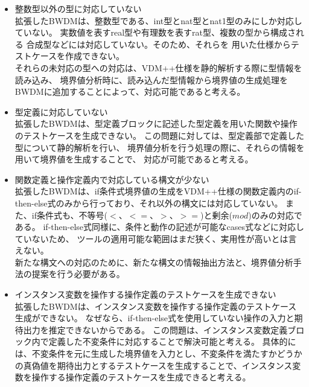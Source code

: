 \documentclass[uplatex, report, a4j, 10pt]{jsbook}
\begin{document}
\begin{itemize}
  \item 整数型以外の型に対応していない\\
        拡張したBWDMは、整数型である、int型とnat型とnat1型のみにしか対応していない。
        実数値を表すreal型や有理数を表すrat型、複数の型から構成される
        合成型などには対応していない。そのため、それらを
        用いた仕様からテストケースを作成できない。\\
        それらの未対応の型への対応は、VDM++仕様を静的解析する際に型情報を読み込み、
        境界値分析時に、読み込んだ型情報から境界値の生成処理をBWDMに追加することによって、対応可能であると考える。

  \item 型定義に対応していない\\
        拡張したBWDMは、型定義ブロックに記述した型定義を用いた関数や操作のテストケースを生成できない。
        この問題に対しては、型定義部で定義した型について静的解析を行い、
        境界値分析を行う処理の際に、それらの情報を用いて境界値を生成することで、
        対応が可能であると考える。

  \item 関数定義と操作定義内で対応している構文が少ない\\
        拡張したBWDMは、if条件式境界値の生成をVDM++仕様の関数定義内のif-then-else式のみから行っており、それ以外の構文には対応していない。
        また、if条件式も、不等号($<、<=、>、>=$)と剰余($mod$)のみの対応である。
        if-then-else式同様に、条件と動作の記述が可能なcases式などに対応していないため、
        ツールの適用可能な範囲はまだ狭く、実用性が高いとは言えない。\\
        新たな構文への対応のために、新たな構文の情報抽出方法と、境界値分析手法の提案を行う必要がある。

  \item インスタンス変数を操作する操作定義のテストケースを生成できない\\
        拡張したBWDMは、インスタンス変数を操作する操作定義のテストケース生成ができない。
        なぜなら、if-then-else式を使用していない操作の入力と期待出力を推定できないからである。
        この問題は、インスタンス変数定義ブロック内で定義した不変条件に対応することで解決可能と考える。
        具体的には、不変条件を元に生成した境界値を入力とし、不変条件を満たすかどうかの真偽値を期待出力とするテストケースを生成することで、インスタンス変数を操作する操作定義のテストケースを生成できると考える。


\end{itemize}
\end{document}
